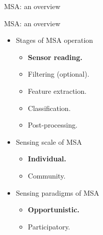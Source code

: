 \begin{frame}{MSA: an overview}
  \begin{block}{MSA: an overview}
  \begin{itemize}
    \item Stages of MSA operation
    \begin{itemize}
      \item \textbf{Sensor reading.}
      \item Filtering (optional).
      \item Feature extraction.
      \item Classification.
      \item Post-processing.
    \end{itemize}

    \item Sensing scale of MSA
    \begin{itemize}
      \item \textbf{Individual.}
      \item Community.
    \end{itemize}

    \item Sensing paradigms of MSA
    \begin{itemize}
      \item \textbf{Opportunistic.}
      \item Participatory.
    \end{itemize}

  \end{itemize}
  \end{block}
\end{frame}


